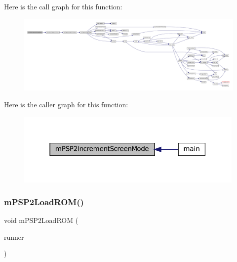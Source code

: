 Here is the call graph for this function\+:
\nopagebreak
\begin{figure}[H]
\begin{center}
\leavevmode
\includegraphics[width=350pt]{psp2-context_8c_a88df7b81ae33955caa66f8f0516c8a2a_cgraph}
\end{center}
\end{figure}
Here is the caller graph for this function\+:
\nopagebreak
\begin{figure}[H]
\begin{center}
\leavevmode
\includegraphics[width=316pt]{psp2-context_8c_a88df7b81ae33955caa66f8f0516c8a2a_icgraph}
\end{center}
\end{figure}
\mbox{\label{psp2-context_8c_a6d1428d32dd856760fa94b6a08e54ab2}} 
\subsubsection{\texorpdfstring{m\+P\+S\+P2\+Load\+R\+O\+M()}{mPSP2LoadROM()}}
{\footnotesize\ttfamily void m\+P\+S\+P2\+Load\+R\+OM (\begin{DoxyParamCaption}\item[{struct \mbox{\hyperlink{structm_g_u_i_runner}{m\+G\+U\+I\+Runner}} $\ast$}]{runner }\end{DoxyParamCaption})}

